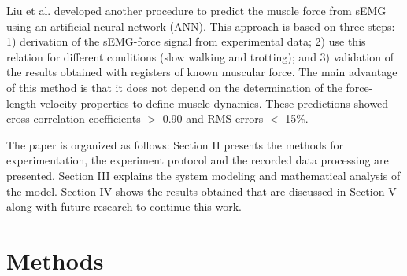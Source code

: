 \documentclass[letterpaper, 10 pt, conference]{ieeeconf}  %
\begin{document}
Liu et al. \cite{Liu1999391} developed another procedure to predict the muscle force from sEMG using an artificial neural network (ANN). This approach is based on three steps: 1) derivation of the sEMG-force signal from experimental data; 2) use this relation for different conditions (slow walking and trotting); and 3) validation of the results obtained with registers of known muscular force. The main advantage of this method is that it does not depend on the determination of the force-length-velocity properties to define muscle dynamics. These predictions showed cross-correlation coefficients \(>\) 0.90 and RMS errors \(<\) 15\%.



% 
% 
% 
% 


% 
The paper is organized as follows: Section II presents the methods for experimentation, the experiment protocol and the recorded data processing are presented. Section III explains the system modeling and mathematical analysis of the model. Section IV shows the results obtained that are discussed in Section V along with future research to continue this work.

\section{Methods}
\end{document}
